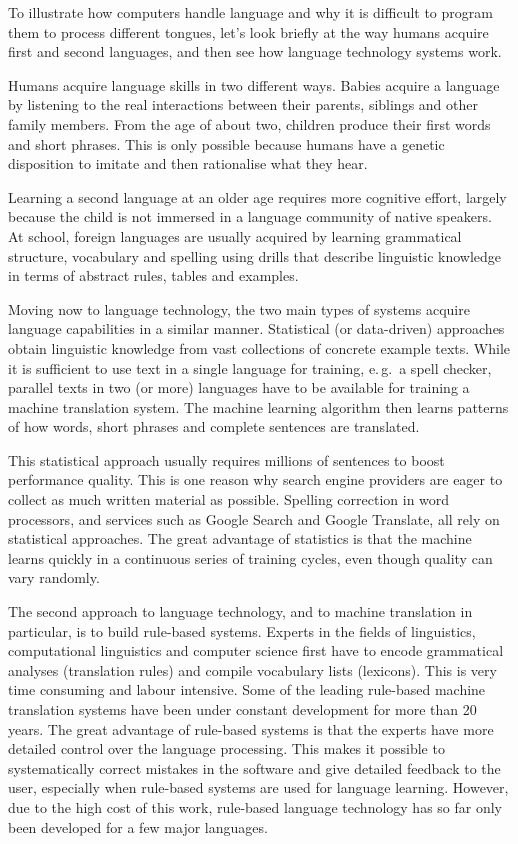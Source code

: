 {\begin{multicols}{2}
To illustrate how computers handle language and why it is difficult to program them to process different tongues, let’s look briefly at the way humans acquire first and second languages, and then see how language technology systems work.

Humans acquire language skills in two different ways. Babies acquire a language by listening to the real interactions between their parents, siblings and other family members. From the age of about two, children produce their first words and short phrases. This is only possible because humans have a genetic disposition to imitate and then rationalise what they hear. 

Learning a second language at an older age requires more cognitive effort, largely because the child is not immersed in a language community of native speakers. At school, foreign languages are usually acquired by learning grammatical structure, vocabulary and spelling using drills that describe linguistic knowledge in terms of abstract rules, tables and examples.


Moving now to language technology, the two main types of systems acquire language capabilities in a similar manner. Statistical (or data-driven) approaches obtain linguistic knowledge from vast collections of concrete example texts. While it is sufficient to use text in a single language for training, e.\,g.~a spell checker, parallel texts in two (or more) languages have to be available for training a machine translation system. The machine learning algorithm then learns patterns of how words, short phrases and complete sentences are translated. 

This statistical approach usually requires millions of sentences to boost performance quality. This is one reason why search engine providers are eager to collect as much written material as possible. Spelling correction in word processors, and services such as Google Search and Google Translate, all rely on statistical approaches. The great advantage of statistics is that the machine learns quickly in a continuous series of training cycles, even though quality can vary randomly.

The second approach to language technology, and to machine translation in particular, is to build rule-based systems. Experts in the fields of linguistics, computational linguistics and computer science first have to encode grammatical analyses (translation rules) and compile vocabulary lists (lexicons). This is very time consuming and labour intensive. Some of the leading rule-based machine translation systems have been under constant development for more than 20 years. The great advantage of rule-based systems is that the experts have more detailed control over the language processing. This makes it possible to systematically correct mistakes in the software and give detailed feedback to the user, especially when rule-based systems are used for language learning. However, due to the high cost of this work, rule-based language technology has so far only been developed for a few major languages. 


\end{multicols}}
